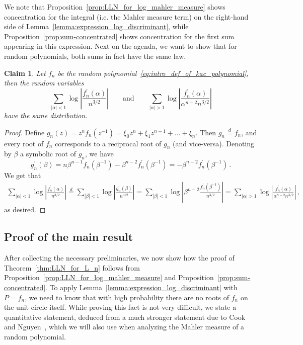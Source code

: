 \documentclass[11pt]{amsart}
\newtheorem{claim}[theorem]{Claim}
\theoremstyle{remark}
\theoremstyle{definition}
\begin{document}
    We note that Proposition~\ref{prop:LLN_for_log_mahler_measure} shows concentration for the integral (i.e. the Mahler measure term) on the right-hand side of Lemma~\ref{lemma:expression_log_discriminant}, while Proposition~\ref{prop:sum-concentrated} shows concentration for the first sum appearing in this expression. Next on the agenda, we want to show that for random polynomials, both sums in fact have the same law. 
    \begin{claim}\label{claim:inside-outside-equidist}
    Let $f_n$ be the random polynomial~\eqref{eq:intro_def_of_kac_polynomial}, then the random variables
		\[
		\sum_{|\alpha|<1} \log\left|\frac{f_n^\prime (\alpha)}{n^{3/2}}\right| \qquad \text{and} \qquad \sum_{|\alpha|>1} \log\left|\frac{f_n^\prime(\alpha)}{\alpha^{n-2} n^{3/2}}\right|
		\]
		have the same distribution.
	\end{claim}
	\begin{proof}
		Define $g_n(z) = z^{n} f_n(z^{-1}) = \xi_0 z^n + \xi_1 z^{n-1} + \ldots+ \xi_n$. Then $g_n\stackrel{d}{=}f_n$, and every root of $f_n$ corresponds to a reciprocal root of $g_n$ (and vice-versa). Denoting by $\beta$ a symbolic root of $g_n$, we have
		\[
		g_n^{\prime}(\beta) = n\beta^{n-1}f_n(\beta^{-1}) - \beta^{n-2} f_n^\prime(\beta^{-1}) = -\beta^{n-2} f_n^{\prime}(\beta^{-1}) \, . 
		\]
		We get that
		\begin{align*}
			\sum_{|\alpha|<1} \log\left|\frac{f_n^\prime (\alpha)}{n^{3/2}}\right| \stackrel{d}{=} \sum_{|\beta|<1} \log\left|\frac{g_n^\prime (\beta)}{n^{3/2}}\right|  = \sum_{|\beta|<1} \log \left|\beta^{n-2} \frac{ f_n^\prime(\beta^{-1})}{n^{3/2}}\right| = \sum_{|\alpha|>1} \log\left|\frac{f_n^\prime(\alpha)}{\alpha^{n-2} n^{3/2}}\right| \, , 
		\end{align*}
		as desired.
	\end{proof}

    \subsection{Proof of the main result}
    After collecting the necessary preliminaries, we now show how the proof of Theorem~\ref{thm:LLN_for_L_n} follows from Proposition~\ref{prop:LLN_for_log_mahler_measure} and Proposition~\ref{prop:sum-concentrated}. To apply Lemma~\ref{lemma:expression_log_discriminant} with $P = f_n$, we need to know that with high probability there are no roots of $f_n$ on the unit circle itself. While proving this fact is not very difficult, we state  a quantitative statement, deduced from a much stronger statement due to Cook and Nguyen~\cite{Cook-Nguyen}, which we will also use when analyzing the Mahler measure of a random polynomial. 
    
\end{document}
